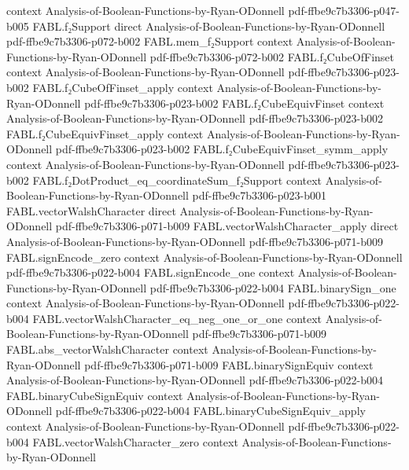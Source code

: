 \begin{theorem}
  {context}
  {Analysis-of-Boolean-Functions-by-Ryan-ODonnell}
  {pdf-ffbe9c7b3306-p047-b005}
\proofstep
  {FABL.f₂Support}
  {direct}
  {Analysis-of-Boolean-Functions-by-Ryan-ODonnell}
  {pdf-ffbe9c7b3306-p072-b002}
\proofstep
  {FABL.mem_f₂Support}
  {context}
  {Analysis-of-Boolean-Functions-by-Ryan-ODonnell}
  {pdf-ffbe9c7b3306-p072-b002}
\proofstep
  {FABL.f₂CubeOfFinset}
  {context}
  {Analysis-of-Boolean-Functions-by-Ryan-ODonnell}
  {pdf-ffbe9c7b3306-p023-b002}
\proofstep
  {FABL.f₂CubeOfFinset_apply}
  {context}
  {Analysis-of-Boolean-Functions-by-Ryan-ODonnell}
  {pdf-ffbe9c7b3306-p023-b002}
\proofstep
  {FABL.f₂CubeEquivFinset}
  {context}
  {Analysis-of-Boolean-Functions-by-Ryan-ODonnell}
  {pdf-ffbe9c7b3306-p023-b002}
\proofstep
  {FABL.f₂CubeEquivFinset_apply}
  {context}
  {Analysis-of-Boolean-Functions-by-Ryan-ODonnell}
  {pdf-ffbe9c7b3306-p023-b002}
\proofstep
  {FABL.f₂CubeEquivFinset_symm_apply}
  {context}
  {Analysis-of-Boolean-Functions-by-Ryan-ODonnell}
  {pdf-ffbe9c7b3306-p023-b002}
\proofstep
  {FABL.f₂DotProduct_eq_coordinateSum_f₂Support}
  {context}
  {Analysis-of-Boolean-Functions-by-Ryan-ODonnell}
  {pdf-ffbe9c7b3306-p023-b001}
\proofstep
  {FABL.vectorWalshCharacter}
  {direct}
  {Analysis-of-Boolean-Functions-by-Ryan-ODonnell}
  {pdf-ffbe9c7b3306-p071-b009}
\proofstep
  {FABL.vectorWalshCharacter_apply}
  {direct}
  {Analysis-of-Boolean-Functions-by-Ryan-ODonnell}
  {pdf-ffbe9c7b3306-p071-b009}
\proofstep
  {FABL.signEncode_zero}
  {context}
  {Analysis-of-Boolean-Functions-by-Ryan-ODonnell}
  {pdf-ffbe9c7b3306-p022-b004}
\proofstep
  {FABL.signEncode_one}
  {context}
  {Analysis-of-Boolean-Functions-by-Ryan-ODonnell}
  {pdf-ffbe9c7b3306-p022-b004}
\proofstep
  {FABL.binarySign_one}
  {context}
  {Analysis-of-Boolean-Functions-by-Ryan-ODonnell}
  {pdf-ffbe9c7b3306-p022-b004}
\proofstep
  {FABL.vectorWalshCharacter_eq_neg_one_or_one}
  {context}
  {Analysis-of-Boolean-Functions-by-Ryan-ODonnell}
  {pdf-ffbe9c7b3306-p071-b009}
\proofstep
  {FABL.abs_vectorWalshCharacter}
  {context}
  {Analysis-of-Boolean-Functions-by-Ryan-ODonnell}
  {pdf-ffbe9c7b3306-p071-b009}
\proofstep
  {FABL.binarySignEquiv}
  {context}
  {Analysis-of-Boolean-Functions-by-Ryan-ODonnell}
  {pdf-ffbe9c7b3306-p022-b004}
\proofstep
  {FABL.binaryCubeSignEquiv}
  {context}
  {Analysis-of-Boolean-Functions-by-Ryan-ODonnell}
  {pdf-ffbe9c7b3306-p022-b004}
\proofstep
  {FABL.binaryCubeSignEquiv_apply}
  {context}
  {Analysis-of-Boolean-Functions-by-Ryan-ODonnell}
  {pdf-ffbe9c7b3306-p022-b004}
\proofstep
  {FABL.vectorWalshCharacter_zero}
  {context}
  {Analysis-of-Boolean-Functions-by-Ryan-ODonnell}

\end{theorem}
